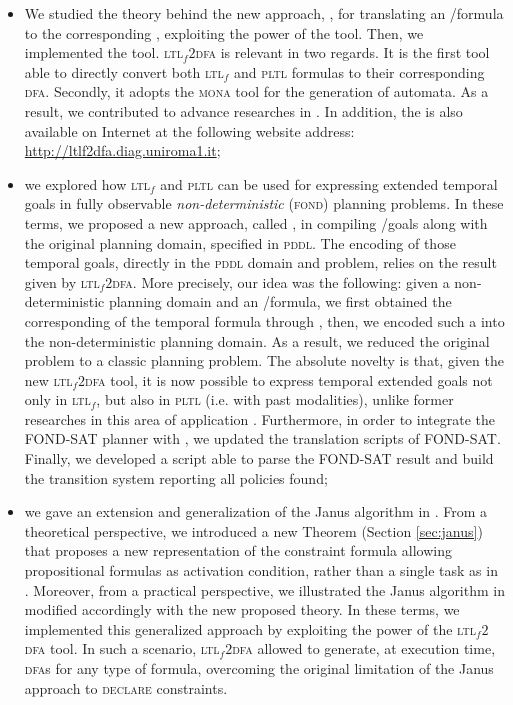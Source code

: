 \begin{itemize}
\item We studied the theory behind the new approach, \LTLfToDFA, for translating an \LTLf/\PLTL formula to the corresponding \DFA, exploiting the power of the \MONA tool. Then, we implemented the \LTLfToDFA tool. \textsc{ltl}$_f2$\textsc{dfa} is relevant in two regards. It is the first tool able to directly convert both \textsc{ltl}$_f$ and \textsc{pltl} formulas to their corresponding \textsc{dfa}. Secondly, it adopts the \textsc{mona} tool for the generation of automata. As a result, we contributed to advance researches in \cite{zhu2017symbolic,zpv2018}. In addition, the \LTLfToDFA is also available on Internet at the following website address: \href{http://ltlf2dfa.diag.uniroma1.it}{http://ltlf2dfa.diag.uniroma1.it};

\item we explored how \textsc{ltl}$_f$ and \textsc{pltl} can be used for expressing extended temporal goals in fully observable \textit{non-deterministic} (\textsc{fond}) planning problems. In these terms, we proposed a new approach, called \FONDFOR, in compiling \LTLf/\PLTL goals along with the original planning domain, specified in \textsc{pddl}.
The encoding of those temporal goals, directly in the \textsc{pddl} domain and problem, relies on the result given by \textsc{ltl}$_f2$\textsc{dfa}. More precisely, our idea was the following: given a non-deterministic planning domain and an \LTLf/\PLTL formula, we first obtained the corresponding \DFA of the temporal formula through \LTLfToDFA, then, we encoded such a \DFA into the non-deterministic planning domain. As a result, we reduced the original problem to a classic \FOND planning problem. The absolute novelty is that, given the new \textsc{ltl}$_f2$\textsc{dfa} tool, it is now possible to express temporal extended goals not only in \textsc{ltl}$_f$, but also in \textsc{pltl} (i.e. with past modalities), unlike  former researches in this area of application \citep{camacho2017non, camacho2018finite, camacho2018ltl}. Furthermore, in order to integrate the FOND-SAT planner with \FONDFOR, we updated the translation scripts of FOND-SAT. Finally, we developed a script able to parse the FOND-SAT result and build the transition system reporting all policies found;

\item we gave an extension and  generalization of the Janus algorithm in \cite{cecconi2018interestingness}. From a theoretical perspective, we introduced a new Theorem (Section \ref{sec:janus}) that proposes a new representation of the constraint formula allowing propositional formulas as activation condition, rather than a single task as in \cite{cecconi2018interestingness}. Moreover, from a practical perspective, we illustrated the Janus algorithm in \cite{cecconi2018interestingness} modified accordingly with the new proposed theory. In these terms, we implemented this generalized approach by exploiting the power of the \textsc{ltl}$_f2$\textsc{dfa} tool. In such a scenario, \textsc{ltl}$_f2$\textsc{dfa} allowed to generate, at execution time, \textsc{dfa}s for any type of formula, overcoming the original limitation of the Janus approach to \textsc{declare} constraints.
\end{itemize}

